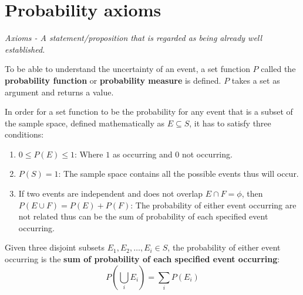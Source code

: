 \documentclass[10pt,a4paper]{article}
\begin{document}
\section{Probability axioms}

\textit{Axioms - A statement/proposition that is regarded as being already well established.}

To be able to understand the uncertainty of an event, a set function $P$ called the \textbf{probability
function} or \textbf{probability measure} is defined. $P$ takes a set as argument and returns
a value.

In order for a set function to be the probability for any event that is a subset of the sample
space, defined mathematically as $E \subseteq S$, it has to satisfy three conditions:
\begin{enumerate}
    \item $0 \leq P(E) \leq 1$: Where $1$ as occurring and $0$ not occurring.
    \item $P(S) = 1$: The sample space contains all the possible events thus will occur.
    \item If two events are independent and does not overlap $E\cap F = \phi$, then $P(E\cup
    F)=P(E)+P(F)$: The probability of either event occurring are not related thus can be the sum of
    probability of each specified event occurring.
\end{enumerate}

\begin{tcolorbox}[breakable,colback=white]
Given three disjoint subsets $E_1,E_2,\dots,E_i \in S$, the probability of either event occurring is the
\textbf{sum of probability of each specified event occurring}:
$$
    P\left(\bigcup_i E_i\right) = \sum_i P(E_i)
$$
\end{tcolorbox}
\end{document}
